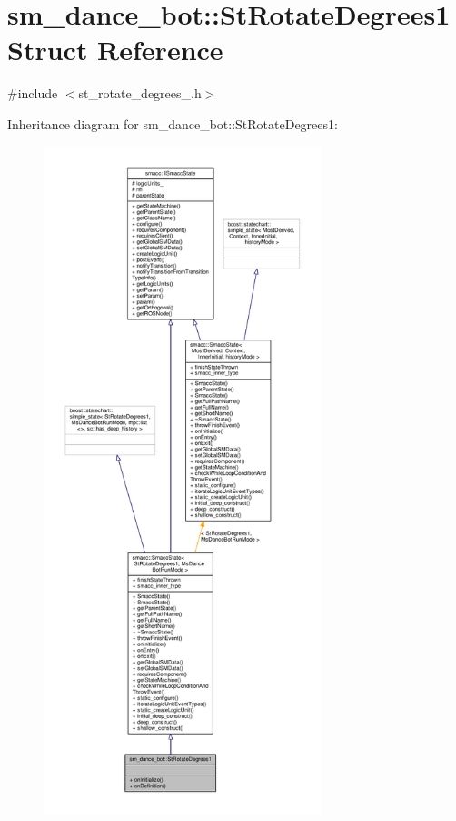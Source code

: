 \hypertarget{structsm__dance__bot_1_1StRotateDegrees1}{}\section{sm\+\_\+dance\+\_\+bot\+:\+:St\+Rotate\+Degrees1 Struct Reference}
\label{structsm__dance__bot_1_1StRotateDegrees1}


{\ttfamily \#include $<$st\+\_\+rotate\+\_\+degrees\+\_.\+h$>$}



Inheritance diagram for sm\+\_\+dance\+\_\+bot\+:\+:St\+Rotate\+Degrees1\+:\nopagebreak
\begin{figure}[H]
\begin{center}
\leavevmode
\includegraphics[height=550pt]{structsm__dance__bot_1_1StRotateDegrees1__inherit__graph}
\end{center}
\end{figure}


